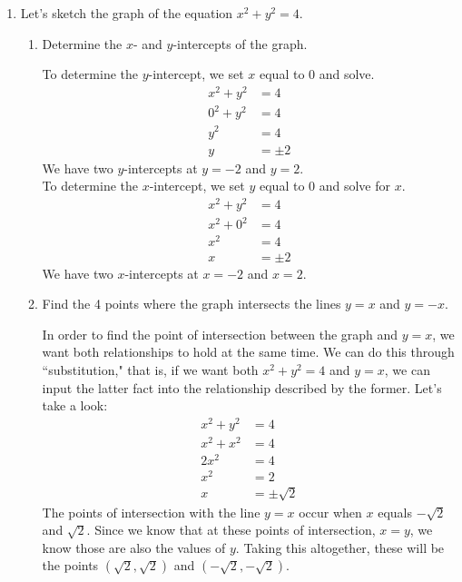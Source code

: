 \documentclass[main]{subfiles}
\begin{document}
\begin{enumerate}[resume]
\item \label{circle-equation}
\begin{problem} 
Let's sketch the graph of the equation $x^2+y^2=4$.
\end{problem}

\begin{enumerate}
    \item
    \begin{problem}
        Determine the $x$- and $y$-intercepts of the graph.
    \end{problem}
    \pspace{\vfill}

    \begin{solution}
        To determine the $y$-intercept, we set $x$ equal to 0 and solve. 
        \begin{align*}
            x^2+y^2 &=4\\
            0^2+y^2 &=4\\
            y^2 &= 4\\
            y&=\pm 2
        \end{align*}
        We have two $y$-intercepts at $y=-2$ and $y=2$.\\
        To determine the $x$-intercept, we set $y$ equal to 0 and solve for $x$.\\
        \begin{align*}
             x^2+y^2 &=4\\
            x^2+0^2 &=4\\
            x^2 &= 4\\
            x&=\pm 2
        \end{align*}
        We have two $x$-intercepts at $x=-2$ and $x=2$.
    \end{solution}

    \item
    \begin{problem}
        Find the 4 points where the graph intersects the lines $y=x$ and $y=-x$.
    \end{problem}
    \pspace{\vfill}

    \begin{solution}
        In order to find the point of intersection between the graph and $y=x$, we want both relationships to hold at the same time. We can do this through ``substitution," that is, if we want both $x^2+y^2=4$ and $y=x$, we can input the latter fact into the relationship described by the former. Let's take a look:
    \begin{align*}
        x^2+y^2&=4\\
        x^2+x^2 &=4\\
        2x^2 &=4\\
        x^2 &= 2\\
        x &= \pm \sqrt{2}
    \end{align*}
    The points of intersection with the line $y=x$ occur when $x$ equals $-\sqrt{2}$ and $\sqrt{2}$. Since we know that at these points of intersection, $x=y$, we know those are also the values of $y$. Taking this altogether, these will be the points $(\sqrt{2},\sqrt{2})$ and $(-\sqrt{2}, -\sqrt{2})$.\\


\end{solution}
\end{enumerate}
\end{enumerate}
\end{document}
